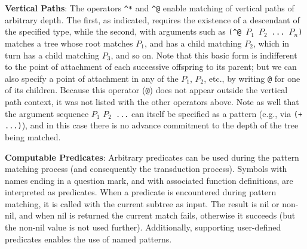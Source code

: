 \documentclass[a4,11pt]{article}
\begin{document}
{\bf Vertical Paths}:
The operators \texttt{\^{}*} and \texttt{\^{}@} enable matching of vertical paths of arbitrary depth. The first, as indicated, requires the existence of a descendant of the specified type, while the second, with arguments such as \texttt{(\^{}@ $P_1$ $P_2$ ... $P_n$)} matches a tree whose root matches \texttt{$P_1$}, and has a child matching \texttt{$P_2$}, which in turn has a child matching \texttt{$P_3$}, and so on. Note that this basic form is indifferent to the point of attachment of each successive offspring to its parent; but we can also specify a point of attachment in any of the \texttt{$P_1$}, \texttt{$P_2$}, etc., by writing \texttt{@} for one of its children.  Because this operator (\texttt{@}) does not appear outside the vertical path context, it was not listed with the other operators above. Note as well that the argument sequence \texttt{$P_1$} \texttt{$P_2$ ...} can itself be specified as a pattern (e.g., via \texttt{(+ ...)}), and in this case there is no advance commitment to the depth of the tree being matched.




{\bf Computable Predicates}:
Arbitrary predicates can be used during the pattern matching process (and consequently the transduction process).   Symbols with names ending in a question mark, and with associated function definitions, are interpreted as predicates.  When a predicate is encountered during pattern matching, it is called with the current subtree as input.  The result is nil or non-nil, and when nil is returned the current match fails, otherwise it succeeds (but the non-nil value is not used further). Additionally, supporting user-defined predicates enables the use of named patterns. 
\end{document}
